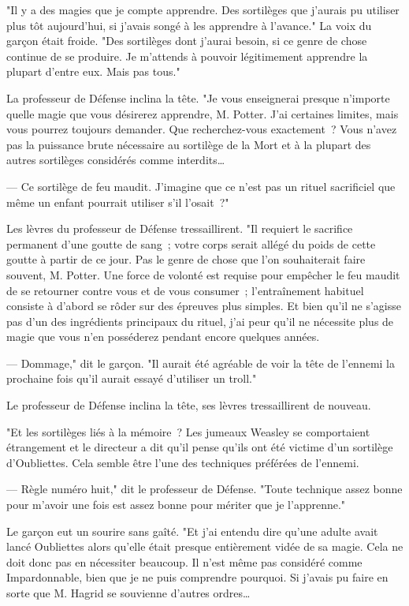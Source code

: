 "Il y a des magies que je compte apprendre. Des sortilèges que j'aurais pu utiliser plus tôt aujourd'hui, si j'avais songé à les apprendre à l'avance." La voix du garçon était froide. "Des sortilèges dont j'aurai besoin, si ce genre de chose continue de se produire. Je m'attends à pouvoir légitimement apprendre la plupart d'entre eux. Mais pas tous."

La professeur de Défense inclina la tête. "Je vous enseignerai presque n'importe quelle magie que vous désirerez apprendre, M. Potter. J'ai certaines limites, mais vous pourrez toujours demander. Que recherchez-vous exactement~? Vous n'avez pas la puissance brute nécessaire au sortilège de la Mort et à la plupart des autres sortilèges considérés comme interdits…

--- Ce sortilège de feu maudit. J'imagine que ce n'est pas un rituel sacrificiel que même un enfant pourrait utiliser s'il l'osait~?"

Les lèvres du professeur de Défense tressaillirent. "Il requiert le sacrifice permanent d'une goutte de sang~; votre corps serait allégé du poids de cette goutte à partir de ce jour. Pas le genre de chose que l'on souhaiterait faire souvent, M. Potter. Une force de volonté est requise pour empêcher le feu maudit de se retourner contre vous et de vous consumer~; l'entraînement habituel consiste à d'abord se rôder sur des épreuves plus simples. Et bien qu'il ne s'agisse pas d'un des ingrédients principaux du rituel, j'ai peur qu'il ne nécessite plus de magie que vous n'en posséderez pendant encore quelques années.

--- Dommage," dit le garçon. "Il aurait été agréable de voir la tête de l'ennemi la prochaine fois qu'il aurait essayé d'utiliser un troll."

Le professeur de Défense inclina la tête, ses lèvres tressaillirent de nouveau.

"Et les sortilèges liés à la mémoire~? Les jumeaux Weasley se comportaient étrangement et le directeur a dit qu'il pense qu'ils ont été victime d'un sortilège d'Oubliettes. Cela semble être l'une des techniques préférées de l'ennemi.

--- Règle numéro huit," dit le professeur de Défense. "Toute technique assez bonne pour m'avoir une fois est assez bonne pour mériter que je l'apprenne."

Le garçon eut un sourire sans gaîté. "Et j'ai entendu dire qu'une adulte avait lancé Oubliettes alors qu'elle était presque entièrement vidée de sa magie. Cela ne doit donc pas en nécessiter beaucoup. Il n'est même pas considéré comme Impardonnable, bien que je ne puis comprendre pourquoi. Si j'avais pu faire en sorte que M. Hagrid se souvienne d'autres ordres…

